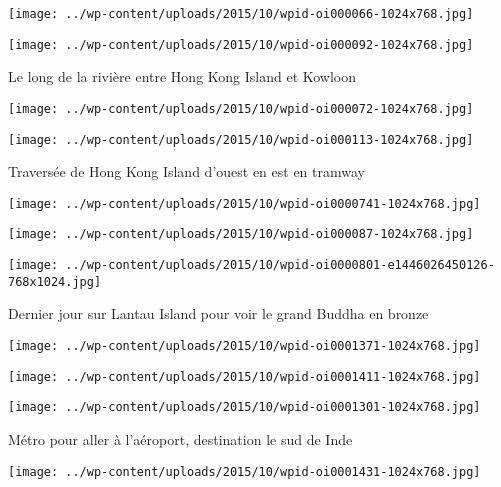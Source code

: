  \newline
\centerline{\texttt{[image: ../wp-content/uploads/2015/10/wpid-oi000066-1024x768.jpg]} } 
 \newline
 \newline
\centerline{\texttt{[image: ../wp-content/uploads/2015/10/wpid-oi000092-1024x768.jpg]} } 
 \newline
 Le long de la rivière entre Hong Kong Island et Kowloon \newline
 \newline
\centerline{\texttt{[image: ../wp-content/uploads/2015/10/wpid-oi000072-1024x768.jpg]} } 
 \newline
 \newline
\centerline{\texttt{[image: ../wp-content/uploads/2015/10/wpid-oi000113-1024x768.jpg]} } 
 \newline
 Traversée de Hong Kong Island d'ouest en est en tramway \newline
 \newline
\centerline{\texttt{[image: ../wp-content/uploads/2015/10/wpid-oi0000741-1024x768.jpg]} } 
 \newline
 \newline
\centerline{\texttt{[image: ../wp-content/uploads/2015/10/wpid-oi000087-1024x768.jpg]} } 
 \newline
 \newline
\centerline{\texttt{[image: ../wp-content/uploads/2015/10/wpid-oi0000801-e1446026450126-768x1024.jpg]} } 
 \newline
 Dernier jour sur Lantau Island pour voir le grand Buddha en bronze \newline
 \newline
\centerline{\texttt{[image: ../wp-content/uploads/2015/10/wpid-oi0001371-1024x768.jpg]} } 
 \newline
 \newline
\centerline{\texttt{[image: ../wp-content/uploads/2015/10/wpid-oi0001411-1024x768.jpg]} } 
 \newline
 \newline
\centerline{\texttt{[image: ../wp-content/uploads/2015/10/wpid-oi0001301-1024x768.jpg]} } 
 \newline
 Métro pour aller à l'aéroport, destination le sud de Inde \newline
 \newline
\centerline{\texttt{[image: ../wp-content/uploads/2015/10/wpid-oi0001431-1024x768.jpg]} } 
 \newline

\newpage
 
